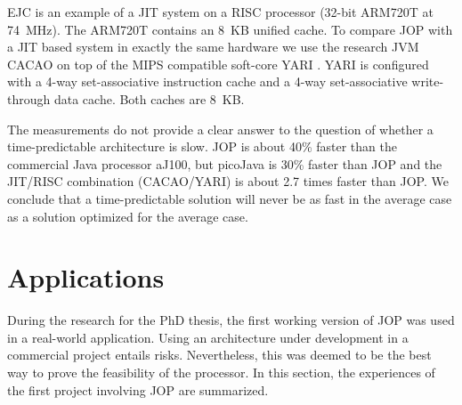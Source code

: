 EJC \cite{EJC} is an example of a JIT system on a RISC processor
(32-bit ARM720T at 74~MHz). The ARM720T contains an 8~KB unified
cache. To compare JOP with a JIT based system in exactly the same
hardware we use the research JVM CACAO \cite{cacao} on top of the
MIPS compatible soft-core YARI \cite{cacao:yari}. YARI is configured
with a 4-way set-associative instruction cache and a 4-way
set-associative write-through data cache. Both caches are 8~KB.

The measurements do not provide a clear answer to the question of
whether a time-predictable architecture is slow. JOP is about 40\%
faster than the commercial Java processor aJ100, but picoJava is 30\%
faster than JOP and the JIT/RISC combination (CACAO/YARI) is about
2.7 times faster than JOP. We conclude that a time-predictable
solution will never be as fast in the average case as a solution
optimized for the average case.



\section{Applications}
\label{sec:applications}

During the research for the PhD thesis, the first working version of
JOP was used in a real-world application. Using an architecture under
development in a commercial project entails risks. Nevertheless, this
was deemed to be the best way to prove the feasibility of the
processor. In this section, the experiences of the first project
involving JOP are summarized.

